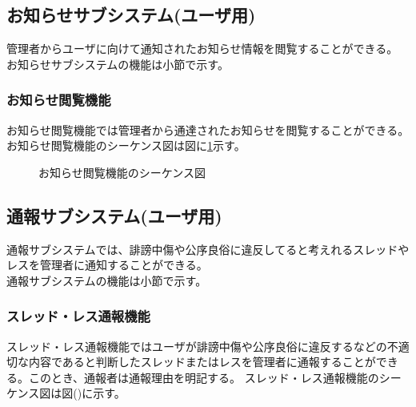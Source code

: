 \documentclass[a4j]{jarticle}
\begin{document}
  \subsection{お知らせサブシステム(ユーザ用)}
  管理者からユーザに向けて通知されたお知らせ情報を閲覧することができる。\\
  お知らせサブシステムの機能は小節で示す。
  \subsubsection{お知らせ閲覧機能}
  お知らせ閲覧機能では管理者から通達されたお知らせを閲覧することができる。
  お知らせ閲覧機能のシーケンス図は図に\ref{fig:news_reading.png}示す。
  
  \begin{figure}[H]
    \centering
    \caption{お知らせ閲覧機能のシーケンス図}
    \label{fig:news_reading.png}
  \end{figure}
  \subsection{通報サブシステム(ユーザ用)}
  通報サブシステムでは、誹謗中傷や公序良俗に違反してると考えれるスレッドやレスを管理者に通知することができる。\\
  通報サブシステムの機能は小節で示す。
  \subsubsection{スレッド・レス通報機能}
  スレッド・レス通報機能ではユーザが誹謗中傷や公序良俗に違反するなどの不適切な内容であると判断したスレッドまたはレスを管理者に通報することができる。このとき、通報者は通報理由を明記する。
  スレッド・レス通報機能のシーケンス図は図()に示す。
\end{document}

